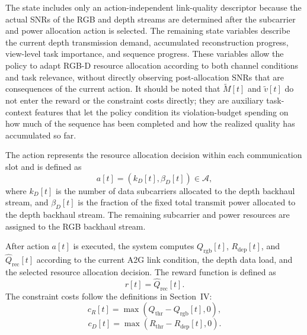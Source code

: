 \documentclass[journal]{IEEEtran}
\begin{document}
The state includes only an action-independent link-quality descriptor because the actual SNRs of the RGB and depth streams are determined after the subcarrier and power allocation action is selected.
The remaining state variables describe the current depth transmission demand, accumulated reconstruction progress, view-level task importance, and sequence progress.
These variables allow the policy to adapt RGB-D resource allocation according to both channel conditions and task relevance, without directly observing post-allocation SNRs that are consequences of the current action.
It should be noted that $\tilde{M}[t]$ and $\tilde{v}[t]$ do not enter the reward or the constraint costs directly; they are auxiliary task-context features that let the policy condition its violation-budget spending on how much of the sequence has been completed and how the realized quality has accumulated so far.

The action represents the resource allocation decision within each communication slot and is defined as
\begin{equation}
a[t]
=
\left(
k_D[t],
\beta_D[t]
\right)
\in
\mathcal{A},
\end{equation}
where $k_D[t]$ is the number of data subcarriers allocated to the depth backhaul stream, and $\beta_D[t]$ is the fraction of the fixed total transmit power allocated to the depth backhaul stream. The remaining subcarrier and power resources are assigned to the RGB backhaul stream.

After action $a[t]$ is executed, the system computes $Q_{\mathrm{rgb}}[t]$, $R_{\mathrm{dep}}[t]$, and $\hat{Q}_{\mathrm{rec}}[t]$ according to the current A2G link condition, the depth data load, and the selected resource allocation decision. The reward function is defined as
\begin{equation}
r[t]
=
\hat{Q}_{\mathrm{rec}}[t].
\end{equation}
The constraint costs follow the definitions in Section~IV:
\begin{equation}
c_R[t]
=
\max
\left(
Q_{\mathrm{thr}}-Q_{\mathrm{rgb}}[t],
0
\right),
\end{equation}
\begin{equation}
c_D[t]
=
\max
\left(
R_{\mathrm{thr}}-R_{\mathrm{dep}}[t],
0
\right).
\end{equation}
\end{document}
